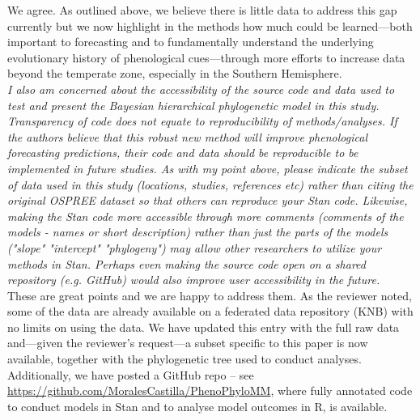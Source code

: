 \documentclass[11pt]{article}
\begin{document}
We agree. As outlined above, we believe there is little data to address this gap currently but we now highlight in the methods how much could be learned---both important to forecasting and to fundamentally understand the underlying evolutionary history of phenological cues---through more efforts to increase data beyond the temperate zone, especially in the Southern Hemisphere. \\ %

\emph{I also am concerned about the accessibility of the source code and data used to test and present the Bayesian hierarchical phylogenetic model in this study. Transparency of code does not equate to reproducibility of methods/analyses. If the authors believe that this robust new method will improve phenological forecasting predictions, their code and data should be reproducible to be implemented in future studies. As with my point above, please indicate the subset of data used in this study (locations, studies, references etc) rather than citing the original OSPREE dataset so that others can reproduce your Stan code. Likewise, making the Stan code more accessible through more comments (comments of the models - names or short description) rather than just the parts of the models ("slope" "intercept" "phylogeny") may allow other researchers to utilize your methods in Stan. Perhaps even making the source code open on a shared repository (e.g. GitHub) would also improve user accessibility in the future.}\\


These are great points and we are happy to address them. As the reviewer noted, some of the data are already available on a federated data repository (KNB) with no limits on using the data. We have updated this entry with the full raw data and---given the reviewer's request---a subset specific to this paper is now available, together with the phylogenetic tree used to conduct analyses. Additionally, we have posted a GitHub repo -- see \url{https://github.com/MoralesCastilla/PhenoPhyloMM}, 
where fully annotated code to conduct models in Stan and to analyse model outcomes in R, is available.\\
\end{document}
